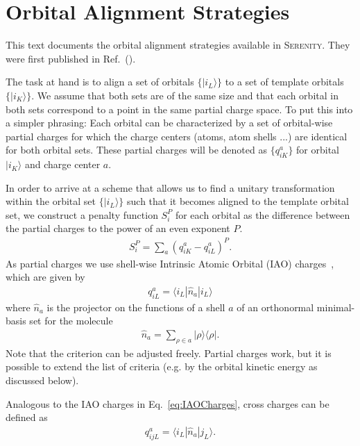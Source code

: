 \section{Orbital Alignment Strategies}
\label{sec:OrbitalAlignmentStrategies}
This text documents the orbital alignment strategies available in \textsc{Serenity}. They were
first published in Ref.~(\cite{Bensberg2020}).

The task at hand is to align a set of orbitals $\{|i_L\rangle \}$ to a set of template orbitals
$\{|i_K\rangle\}$. We assume that both sets are of the same size and that each orbital in both
sets correspond to a point in the same partial charge space.
To put this into a simpler phrasing: Each orbital can be characterized by a set of orbital-wise partial charges for
which the charge centers (atoms, atom shells ...) are identical for both orbital sets. These partial charges will be
denoted as $ \{q_{iK}^a\} $ for orbital $|i_K\rangle$ and charge center $a$.

In order to arrive at a scheme that allows us to find a unitary transformation within the orbital set
$\{|i_L\rangle \}$ such that it becomes aligned to the template orbital set, we construct a penalty
function $S_{i}^P$ for each orbital as the difference between the partial charges to the power of an even exponent
$P$.
\begin{align}
  S_i^P = \sum_a(q_{iK}^a - q_{iL}^a)^P.
  \label{eq:similarityMeasure}
\end{align}
As partial charges we use shell-wise Intrinsic Atomic Orbital (IAO) charges~\cite{Knizia2013}, which are given by
\begin{align}
  q_{iL}^a = \langle i_L|\hat{n}_a|i_L\rangle
  \label{eq:IAOCharges}
\end{align}
where $\hat{n}_a$ is the projector on the functions of a shell $a$ of an orthonormal minimal-basis set for the
molecule
\begin{align}
   \hat{n}_a = \sum_{\rho\in a} |\rho\rangle\langle \rho |.
\end{align}
Note that the criterion can be adjusted freely. Partial charges work, but it is possible to
extend the list of criteria (e.g. by the orbital kinetic energy as discussed below).

Analogous to the IAO charges in Eq.~\ref{eq:IAOCharges}, cross charges can be defined as
\begin{align}
  q_{ijL}^a = \langle i_L|\hat{n}_a|j_L\rangle.
  \label{eq:IAOCrossCharges}
\end{align}


